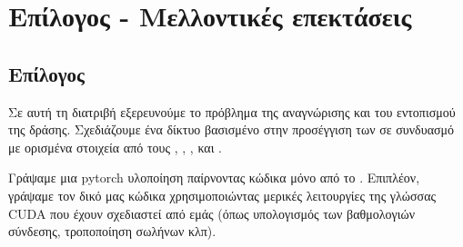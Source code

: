 



% 


% 
\gr 

\chapter{Επίλογος - Μελλοντικές επεκτάσεις}
\section{Επίλογος}
Σε αυτή τη διατριβή εξερευνούμε το πρόβλημα της αναγνώρισης και του εντοπισμού της δράσης.
Σχεδιάζουμε ένα δίκτυο βασισμένο στην προσέγγιση των  \cite{DBLP:journals/corr/HouCS17} σε συνδυασμό με ορισμένα στοιχεία από τους \en\cite{DBLP:journals/corr/abs-1712-09184},
\cite{Ren:2015:FRT:2969239.2969250}, \cite{Girshick:2015:FR:2919332.2920125}, \cite{DBLP:journals/corr/abs-1903-00304} \gr
 και \en \cite{hara3dcnns}\gr. \par

 Γράψαμε μια \en pytorch \gr υλοποίηση παίρνοντας κώδικα  μόνο από το \en \cite{jjfaster2rcnn}\gr. Επιπλέον, γράψαμε τον δικό μας κώδικα χρησιμοποιώντας
 μερικές λειτουργίες της γλώσσας \en CUDA \gr που έχουν σχεδιαστεί από εμάς (όπως
υπολογισμός των βαθμολογιών σύνδεσης, τροποποίηση σωλήνων κλπ). \par


